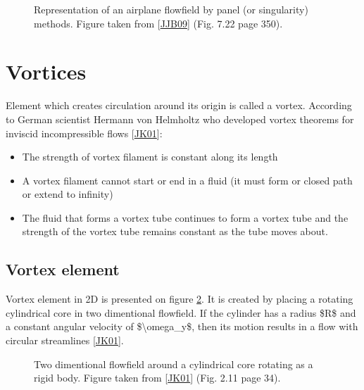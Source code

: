 \documentclass[letterpaper,10pt,english]{jupyterBook}
\let\sphinxpxdimen\pdfpxdimen\else\newdimen\sphinxpxdimen
\begin{document}
\begin{figure}[htbp]
\centering
\capstart

\noindent\sphinxincludegraphics[height=250\sphinxpxdimen]{{panels}.png}
\caption{Representation of an airplane flowfield by panel (or singularity) methods. Figure taken from {[}\hyperlink{cite.chapters/bibliography:id4}{JJB09}{]} (Fig. 7.22 page 350).}\label{\detokenize{chapters/theory:panel-method}}\end{figure}


\section{Vortices}
\label{\detokenize{chapters/theory:vortices}}
\sphinxAtStartPar
Element which creates circulation around its origin is called a vortex. According to German scientist Hermann von Helmholtz who developed vortex theorems for inviscid incompressible flows {[}\hyperlink{cite.chapters/bibliography:id3}{JK01}{]}:
\begin{itemize}
\item {} 
\sphinxAtStartPar
The strength of vortex filament is constant along its length

\item {} 
\sphinxAtStartPar
A vortex filament cannot start or end in a fluid (it must form or closed path or extend to infinity)

\item {} 
\sphinxAtStartPar
The fluid that forms a vortex tube continues to form a vortex tube and the strength of the vortex tube remains constant as the tube moves about.

\end{itemize}


\subsection{Vortex element}
\label{\detokenize{chapters/theory:vortex-element}}
\sphinxAtStartPar
Vortex element in 2D is presented on figure \hyperref[\detokenize{chapters/theory:vortex}]{\ref{\detokenize{chapters/theory:vortex}}}. It is created by placing a rotating cylindrical core in two dimentional flowfield. If the cylinder has a radius \$R\$ and a constant angular velocity of \$\textbackslash{}omega\_y\$, then its motion results in a flow with circular streamlines {[}\hyperlink{cite.chapters/bibliography:id3}{JK01}{]}.

\begin{figure}[htbp]
\centering
\capstart

\noindent{}
\caption{Two dimentional flowfield around a cylindrical core rotating as a rigid body. Figure taken from {[}\hyperlink{cite.chapters/bibliography:id3}{JK01}{]} (Fig. 2.11 page 34).}\label{\detokenize{chapters/theory:vortex}}\end{figure}
\end{document}
